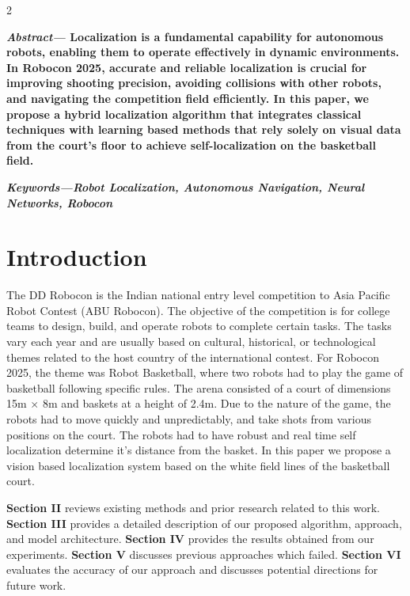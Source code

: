 \documentclass[a4paper]{article}
\begin{document}
\begin{multicols}{2}
\setlength{\columnsep}{0.5cm}

\noindent \textbf{\textit{Abstract---}
Localization is a fundamental capability for autonomous robots, enabling them 
to operate effectively in dynamic environments.
In Robocon 2025, accurate and 
reliable localization is crucial for improving shooting precision, avoiding 
collisions with other robots, and navigating the competition field efficiently.
In this paper, we propose a hybrid localization algorithm that integrates classical 
techniques with learning based methods that rely solely on visual data from the court’s
floor to achieve self-localization on the basketball field.
}

\small  
\noindent \textbf{
  \textit{Keywords---}\textit{Robot Localization, Autonomous Navigation, Neural Networks, Robocon}}

\section{Introduction}
\par \noindent
The DD Robocon is the Indian national entry level competition to Asia Pacific Robot Contest (ABU Robocon).
The objective of the competition is for college teams to design, build, and operate robots to complete certain tasks.
The tasks vary each year and are usually based on cultural, historical, or technological themes related to the host country of the international contest.
For Robocon 2025, the theme was Robot Basketball, where two robots had to play the game of basketball following specific rules.
The arena consisted of a court of dimensions 15m $\times$ 8m and baskets at a height of 2.4m.
Due to the nature of the game, the robots had to move quickly and unpredictably, and take shots from various positions on the court.
The robots had to have robust and real time self localization determine it's distance from the basket.
In this paper we propose a vision based localization system based on the white field lines of the basketball court.
\par \noindent
\textbf{Section II} reviews existing methods and prior research related to this work.
\textbf{Section III} provides a detailed description of our proposed algorithm, approach, and model architecture.
\textbf{Section IV} provides the results obtained from our experiments. 
\textbf{Section V} discusses previous approaches which failed.
\textbf{Section VI} evaluates the accuracy of our approach and discusses potential directions for future work.

\end{multicols}
\end{document}
